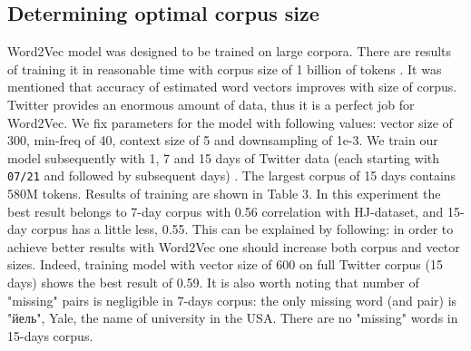 \documentclass{llncs}
\begin{document}
\subsection{Determining optimal corpus size}
Word2Vec model was designed to be trained on large corpora. There are results of training it in reasonable time with corpus size of 1 billion of tokens \cite{Word2Vec}. It was mentioned that accuracy of estimated word vectors improves with size of corpus. Twitter provides an enormous amount of data, thus it is a perfect job for Word2Vec. We fix parameters for the model with following values: vector size of 300, min-freq of 40, context size of 5 and downsampling of 1e-3. We train our model subsequently with 1, 7 and 15 days of Twitter data (each starting with {\tt07/21} and followed by subsequent days) . The largest corpus of 15 days contains 580M tokens. Results of training are shown in Table 3. In this experiment the best result belongs to 7-day corpus with 0.56 correlation with HJ-dataset, and 15-day corpus has a little less, 0.55. This can be explained by following: in order to achieve better results with Word2Vec one should increase both corpus and vector sizes. Indeed, training model with vector size of 600 on full Twitter corpus (15 days) shows the best result of 0.59. It is also worth noting that number of "missing" pairs is negligible in 7-days corpus: the only missing word (and pair) is "\foreignlanguage{russian}{йель}", Yale, the name of university in the USA. There are no "missing" words in 15-days corpus. 
\end{document}
